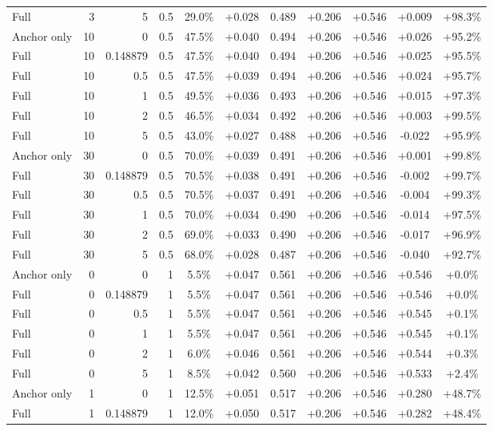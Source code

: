 \begin{table}[htbp]
\begin{tabular}{lrrrccccccc}
Full & 3 & 5 & 0.5 & 29.0\% & +0.028 & 0.489 & +0.206 & +0.546 & +0.009 & +98.3\% \\
Anchor only & 10 & 0 & 0.5 & 47.5\% & +0.040 & 0.494 & +0.206 & +0.546 & +0.026 & +95.2\% \\
Full & 10 & 0.148879 & 0.5 & 47.5\% & +0.040 & 0.494 & +0.206 & +0.546 & +0.025 & +95.5\% \\
Full & 10 & 0.5 & 0.5 & 47.5\% & +0.039 & 0.494 & +0.206 & +0.546 & +0.024 & +95.7\% \\
Full & 10 & 1 & 0.5 & 49.5\% & +0.036 & 0.493 & +0.206 & +0.546 & +0.015 & +97.3\% \\
Full & 10 & 2 & 0.5 & 46.5\% & +0.034 & 0.492 & +0.206 & +0.546 & +0.003 & +99.5\% \\
Full & 10 & 5 & 0.5 & 43.0\% & +0.027 & 0.488 & +0.206 & +0.546 & -0.022 & +95.9\% \\
Anchor only & 30 & 0 & 0.5 & 70.0\% & +0.039 & 0.491 & +0.206 & +0.546 & +0.001 & +99.8\% \\
Full & 30 & 0.148879 & 0.5 & 70.5\% & +0.038 & 0.491 & +0.206 & +0.546 & -0.002 & +99.7\% \\
Full & 30 & 0.5 & 0.5 & 70.5\% & +0.037 & 0.491 & +0.206 & +0.546 & -0.004 & +99.3\% \\
Full & 30 & 1 & 0.5 & 70.0\% & +0.034 & 0.490 & +0.206 & +0.546 & -0.014 & +97.5\% \\
Full & 30 & 2 & 0.5 & 69.0\% & +0.033 & 0.490 & +0.206 & +0.546 & -0.017 & +96.9\% \\
Full & 30 & 5 & 0.5 & 68.0\% & +0.028 & 0.487 & +0.206 & +0.546 & -0.040 & +92.7\% \\
Anchor only & 0 & 0 & 1 & 5.5\% & +0.047 & 0.561 & +0.206 & +0.546 & +0.546 & +0.0\% \\
Full & 0 & 0.148879 & 1 & 5.5\% & +0.047 & 0.561 & +0.206 & +0.546 & +0.546 & +0.0\% \\
Full & 0 & 0.5 & 1 & 5.5\% & +0.047 & 0.561 & +0.206 & +0.546 & +0.545 & +0.1\% \\
Full & 0 & 1 & 1 & 5.5\% & +0.047 & 0.561 & +0.206 & +0.546 & +0.545 & +0.1\% \\
Full & 0 & 2 & 1 & 6.0\% & +0.046 & 0.561 & +0.206 & +0.546 & +0.544 & +0.3\% \\
Full & 0 & 5 & 1 & 8.5\% & +0.042 & 0.560 & +0.206 & +0.546 & +0.533 & +2.4\% \\
Anchor only & 1 & 0 & 1 & 12.5\% & +0.051 & 0.517 & +0.206 & +0.546 & +0.280 & +48.7\% \\
Full & 1 & 0.148879 & 1 & 12.0\% & +0.050 & 0.517 & +0.206 & +0.546 & +0.282 & +48.4\% \\

\end{tabular}
\end{table}
